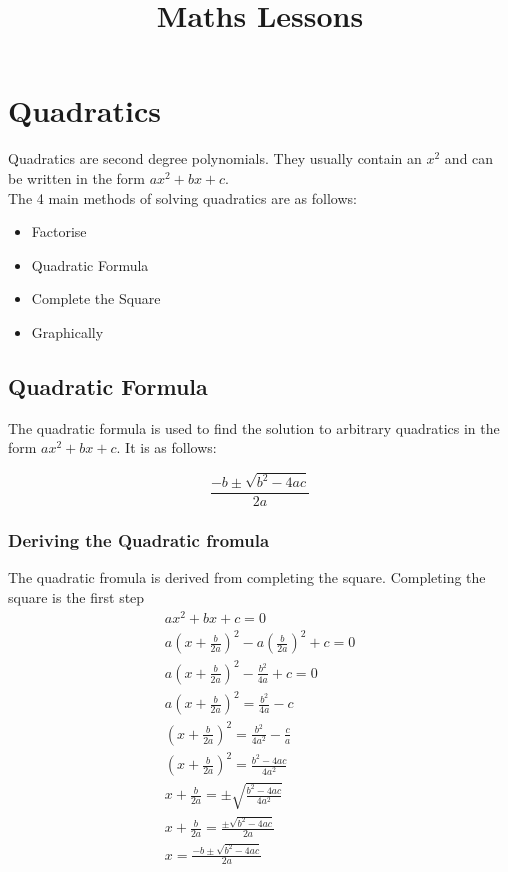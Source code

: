 \documentclass{article}
\begin{document}
\title{Maths Lessons}
\maketitle

\section{Quadratics}
Quadratics are second degree polynomials. They usually contain an $x^2$ and can be written
in the form $ax^2 + bx + c$.
\\
The 4 main methods of solving quadratics are as follows:
\begin{itemize}
	\item Factorise
	\item Quadratic Formula
	\item Complete the Square
	\item Graphically
\end{itemize}

\subsection{Quadratic Formula}
The quadratic formula is used to find the solution to arbitrary quadratics in the form $ax^2 + bx + c$. It is as follows:

\begin{equation}
	\frac{-b \pm \sqrt{b^2 - 4ac}}{2a}
\end{equation}

\subsubsection{Deriving the Quadratic fromula}
The quadratic fromula is derived from completing the square. Completing the square is the first step
\begin{gather*}
	ax^2 + bx + c = 0\\
	a \left (x + \frac{b}{2a} \right )^2 - a\left (\frac{b}{2a} \right )^2 + c = 0 \\
	a \left (x + \frac{b}{2a} \right )^2 - \frac{b^2}{4a} + c = 0 \\
	a \left (x + \frac{b}{2a} \right )^2 = \frac{b^2}{4a} - c \\
	\left (x + \frac{b}{2a} \right )^2 = \frac{b^2}{4a^2} - \frac{c}{a} \\
	\left (x + \frac{b}{2a} \right )^2 = \frac{b^2 - 4ac}{4a^2} \\
	x + \frac{b}{2a} = \pm \sqrt{\frac{b^2 - 4ac}{4a^2}} \\
	x + \frac{b}{2a} = \frac{\pm \sqrt{b^2 - 4ac}}{2a} \\
	x = \frac{-b \pm \sqrt{b^2 - 4ac}}{2a} \\
\end{gather*}
\end{document}

